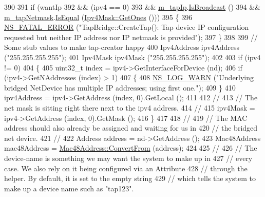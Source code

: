 \begin{DoxyCode}
390 
391       \textcolor{keywordflow}{if} (wantIp
392           && (ipv4 == 0)
393           && \hyperlink{classns3_1_1TapBridge_a8cfe2b69cef36dbf048cb9006318b41b}{m\_tapIp}.\hyperlink{classns3_1_1Ipv4Address_acff8d940bf4cc9282cf67c75eb9d777f}{IsBroadcast} ()
394           && \hyperlink{classns3_1_1TapBridge_a9374f832e2a96385651d27a5fbc7ba57}{m\_tapNetmask}.\hyperlink{classns3_1_1Ipv4Mask_a1428fba537359418d0b7d8c84a135a7e}{IsEqual} (\hyperlink{classns3_1_1Ipv4Mask_af712cbdf28c039025d4aa45fa7e243dd}{Ipv4Mask::GetOnes} ()))
395         \{
396           \hyperlink{group__fatal_ga5131d5e3f75d7d4cbfd706ac456fdc85}{NS\_FATAL\_ERROR} (\textcolor{stringliteral}{"TapBridge::CreateTap(): Tap device IP configuration requested but
       neither IP address nor IP netmask is provided"});
397         \}
398 
399       \textcolor{comment}{// Some stub values to make tap-creator happy}
400       Ipv4Address ipv4Address (\textcolor{stringliteral}{"255.255.255.255"});
401       Ipv4Mask ipv4Mask (\textcolor{stringliteral}{"255.255.255.255"});
402 
403       \textcolor{keywordflow}{if} (ipv4 != 0)
404         \{
405           uint32\_t index = ipv4->GetInterfaceForDevice (nd);
406           \textcolor{keywordflow}{if} (ipv4->GetNAddresses (index) > 1)
407             \{
408               \hyperlink{group__logging_gade7208b4009cdf0e25783cd26766f559}{NS\_LOG\_WARN} (\textcolor{stringliteral}{"Underlying bridged NetDevice has multiple IP addresses; using first
       one."});
409             \}
410           ipv4Address = ipv4->GetAddress (index, 0).GetLocal ();
411 
412           \textcolor{comment}{//}
413           \textcolor{comment}{// The net mask is sitting right there next to the ipv4 address.}
414           \textcolor{comment}{//}
415           ipv4Mask = ipv4->GetAddress (index, 0).GetMask ();
416         \}
417 
418       \textcolor{comment}{//}
419       \textcolor{comment}{// The MAC address should also already be assigned and waiting for us in}
420       \textcolor{comment}{// the bridged net device.}
421       \textcolor{comment}{//}
422       Address address = nd->GetAddress ();
423       Mac48Address mac48Address = \hyperlink{classns3_1_1Mac48Address_a911ce13603a9ef837545a032b6523ae4}{Mac48Address::ConvertFrom} (address);
424 
425       \textcolor{comment}{//}
426       \textcolor{comment}{// The device-name is something we may want the system to make up in }
427       \textcolor{comment}{// every case.  We also rely on it being configured via an Attribute }
428       \textcolor{comment}{// through the helper.  By default, it is set to the empty string }
429       \textcolor{comment}{// which tells the system to make up a device name such as "tap123".}

\end{DoxyCode}
